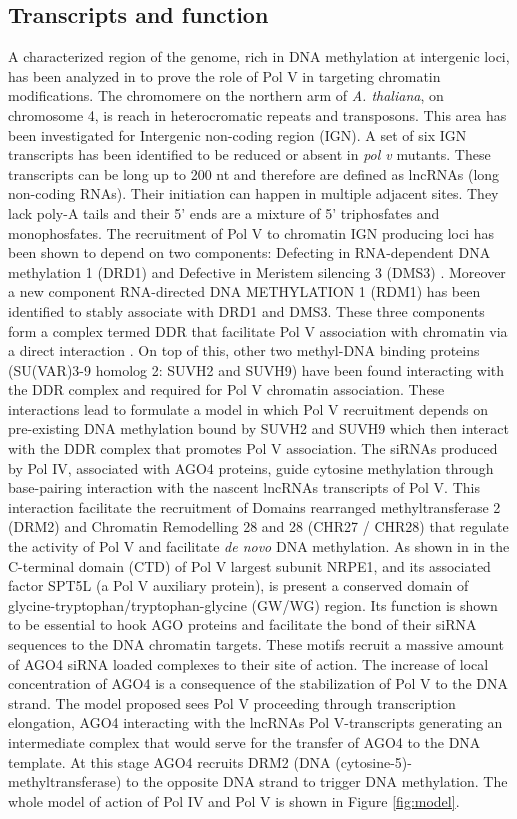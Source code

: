 \documentclass[a4paper, twocolumn]{article}
\begin{document}
\subsection{Transcripts and function}
A characterized region of the genome, rich in DNA methylation at intergenic loci, has been analyzed in \cite{wierzbick1} to prove the role of Pol V in targeting chromatin modifications. 
The chromomere on the northern arm of \textit{A. thaliana}, on chromosome 4, is reach in heterocromatic repeats and transposons. This area has been investigated for Intergenic non-coding region (IGN). A set of six IGN transcripts has been identified to be reduced or absent in \textit{pol v} mutants. These transcripts can be long up to 200 nt and therefore are defined as lncRNAs (long non-coding RNAs). Their initiation can happen in multiple adjacent sites. They lack poly-A tails and their 5' ends are a mixture of 5' triphosfates and monophosfates. 
The recruitment of Pol V to chromatin IGN producing loci has been shown to depend on two components: Defecting in RNA-dependent DNA methylation 1 (DRD1) and Defective in Meristem silencing 3 (DMS3) \cite{wierzbick1}. Moreover a new component RNA-directed DNA METHYLATION 1 (RDM1) has been identified to stably associate with DRD1 and DMS3. These three components form a complex termed DDR that facilitate Pol V association with chromatin via a direct interaction  \cite{LAW2010}. On top of this, other two methyl-DNA binding proteins (SU(VAR)3-9 homolog 2: SUVH2 and SUVH9) have been found interacting with the DDR complex \cite{Johnson2014} and required for Pol V chromatin association. These interactions lead to formulate a model in which Pol V recruitment depends on pre-existing DNA methylation bound by  SUVH2 and SUVH9 which then interact with the DDR complex that promotes Pol V association.
The siRNAs produced by Pol IV, associated with AGO4 proteins, guide cytosine methylation through base-pairing interaction with the nascent lncRNAs transcripts of Pol V. \cite{Wierzbicki2009} This interaction facilitate the recruitment of Domains rearranged methyltransferase 2 (DRM2) and Chromatin Remodelling 28 and 28 (CHR27 / CHR28) that regulate the activity of Pol V and facilitate \textit{de novo} DNA methylation.
As shown in \cite{LAHMY2016} in the C-terminal domain (CTD) of Pol V largest subunit NRPE1, and its associated factor SPT5L (a Pol V auxiliary protein), is present a conserved domain of glycine-tryptophan/tryptophan-glycine (GW/WG) region. Its function is shown to be essential to hook AGO proteins and facilitate the bond of their siRNA sequences to the DNA chromatin targets. These motifs recruit a massive amount of AGO4 siRNA loaded complexes to their site of action. The increase of local concentration of AGO4 is a consequence of the stabilization of Pol V to the DNA strand. The model proposed sees Pol V proceeding through transcription elongation, AGO4 interacting with the lncRNAs Pol V-transcripts generating an intermediate complex that would serve for the transfer of AGO4 to the DNA template. At this stage AGO4 recruits DRM2 (DNA (cytosine-5)-methyltransferase) to the opposite DNA strand to trigger DNA methylation.
The whole model of action of Pol IV and Pol V is shown in Figure \ref{fig:model}.
\end{document}
